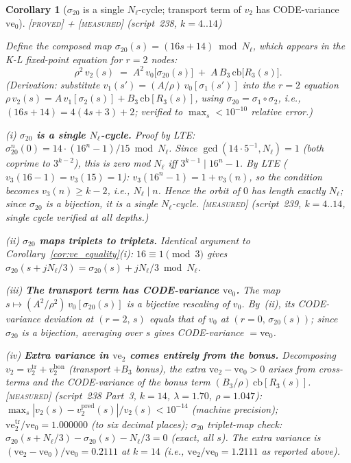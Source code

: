 \documentclass[11pt]{article}
\newtheorem{corollary}[theorem]{Corollary}
\theoremstyle{definition}
\newcommand{\PROVED}{\textup{[\textsc{proved}]}}
\newcommand{\MEASURED}{\textup{[\textsc{measured}]}}
\begin{document}
\begin{corollary}[$\sigma_{20}$ is a single $N_\ell$-cycle; transport term
of $v_2$ has CODE-variance $\mathrm{ve}_0$]\label{cor:sigma20}
\PROVED{} + \MEASURED{} (script~238, $k{=}4..14$)

Define the composed map $\sigma_{20}(s) = (16s + 14) \bmod N_\ell$,
which appears in the K-L fixed-point equation for $r{=}2$ nodes:
\begin{equation}\label{eq:v2decomp}
  \rho^2\,v_2(s) \;=\; A^2\,v_0\bigl[\sigma_{20}(s)\bigr]
  \;+\; A\,B_3\,\mathrm{cb}\bigl[R_3(s)\bigr].
\end{equation}
\textup{(Derivation: substitute $v_1(s') = (A/\rho)\,v_0[\sigma_1(s')]$ into the
$r{=}2$ equation $\rho\,v_2(s) = A\,v_1[\sigma_2(s)] + B_3\,\mathrm{cb}[R_3(s)]$,
using $\sigma_{20} = \sigma_1 \circ \sigma_2$, i.e.,
$(16s+14) = 4(4s+3)+2$; verified to $\max_s\!<\!10^{-10}$ relative error.)}

(i) \textbf{$\sigma_{20}$ is a single $N_\ell$-cycle.} Proof by LTE:
$\sigma_{20}^n(0) = 14\cdot(16^n-1)/15 \bmod N_\ell$.
Since $\gcd(14\cdot 5^{-1}, N_\ell)=1$ (both coprime to $3^{k-2}$),
this is zero mod $N_\ell$ iff $3^{k-1}\mid 16^n-1$.
By LTE ($v_3(16-1)=v_3(15)=1$): $v_3(16^n-1)=1+v_3(n)$,
so the condition becomes $v_3(n)\ge k-2$, i.e., $N_\ell \mid n$.
Hence the orbit of $0$ has length exactly $N_\ell$; since $\sigma_{20}$ is
a bijection, it is a single $N_\ell$-cycle.
\MEASURED{} (script~239, $k=4..14$, single cycle verified at all depths.)

(ii) \textbf{$\sigma_{20}$ maps triplets to triplets.}
Identical argument to Corollary~\ref{cor:ve_equality}(i):
$16 \equiv 1\pmod{3}$ gives $\sigma_{20}(s+jN_\ell/3)=\sigma_{20}(s)+jN_\ell/3 \bmod N_\ell$.

(iii) \textbf{The transport term has CODE-variance $\mathrm{ve}_0$.}
The map $s\mapsto (A^2/\rho^2)\,v_0[\sigma_{20}(s)]$ is a bijective rescaling
of $v_0$. By~(ii), its CODE-variance deviation at $(r{=}2,\,s)$ equals
that of $v_0$ at $(r{=}0,\,\sigma_{20}(s))$;
since $\sigma_{20}$ is a bijection, averaging over $s$ gives CODE-variance $= \mathrm{ve}_0$.

(iv) \textbf{Extra variance in $\mathrm{ve}_2$ comes entirely from the bonus.}
Decomposing $v_2 = v_2^{\mathrm{tr}} + v_2^{\mathrm{bon}}$ (transport $+ B_3$ bonus),
the extra $\mathrm{ve}_2 - \mathrm{ve}_0 > 0$ arises from cross-terms and
the CODE-variance of the bonus term $(B_3/\rho)\,\mathrm{cb}[R_3(s)]$.
\MEASURED{} (script~238 Part~3, $k{=}14$, $\lambda{=}1.70$, $\rho{=}1.047$):
$\max_s|v_2(s) - v_2^{\mathrm{pred}}(s)|/v_2(s) < 10^{-14}$ (machine precision);
$\mathrm{ve}_2^{\mathrm{tr}}/\mathrm{ve}_0 = 1.000000$ (to six decimal places);
$\sigma_{20}$ triplet-map check: $\sigma_{20}(s{+}N_\ell/3) - \sigma_{20}(s) - N_\ell/3 = 0$
(exact, all $s$).
The extra variance is $(\mathrm{ve}_2-\mathrm{ve}_0)/\mathrm{ve}_0 = 0.2111$
at $k{=}14$ (i.e., $\mathrm{ve}_2/\mathrm{ve}_0 = 1.2111$ as reported above).
\end{corollary}
\end{document}
